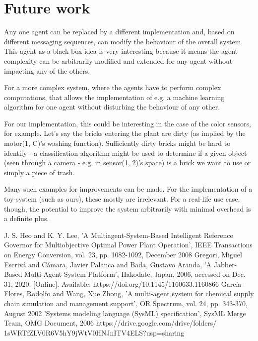 \documentclass[conference]{IEEEtran}
\begin{document}
\section{Future work}

Any one agent can be replaced by a different implementation and, based on different messaging sequences, can modify the behaviour of the overall system. This agent-as-a-black-box idea is very interesting because it means the agent complexity can be arbitrarily modified and extended for any agent without impacting any of the others. 

For a more complex system, where the agents have to perform complex computations, that allows the implementation of e.g. a machine learning algorithm for one agent without disturbing the behaviour of any other. 

For our implementation, this could be interesting in the case of the color sensors, for example. Let's say the bricks entering the plant are dirty (as implied by the motor(1, C)'s washing function). Sufficiently dirty bricks might be hard to identify - a classification algorithm might be used to determine if a given object (seen through a camera - e.g. in sensor(1, 2)'s space) is a brick we want to use or simply a piece of trash.

Many such examples for improvements can be made. For the implementation of a toy-system (such as ours), these mostly are irrelevant. For a real-life use case, though, the potential to improve the system arbitrarily with minimal overhead is a definite plus. 


\begin{thebibliography}{03}
 J. S. Heo and K. Y. Lee, 'A Multiagent-System-Based Intelligent Reference Governor for Multiobjective Optimal Power Plant Operation', IEEE Transactions on Energy Conversion, vol. 23, pp. 1082-1092, December 2008
 Gregori, Miguel Escriv\'{a} and C\'{a}mara, Javier Palanca and Bada, Gustavo Aranda, 'A Jabber-Based Multi-Agent System Platform', Hakodate, Japan, 2006, accessed on Dec. 31, 2020. [Online]. Available: https://doi.org/10.1145/1160633.1160866
 Garc{\'i}a-Flores, Rodolfo and Wang, Xue Zhong, 'A multi-agent system for chemical supply chain simulation and management support', OR Spectrum, vol. 24, pp. 343-370, August 2002
 'Systems modeling language (SysML) specification', SysML Merge Team, OMG Document,  2006
 https://drive.google.com/drive/folders/\\ 1sWRTfZLV0R6V5hY9jWtV0HNJnITV4ELS?usp=sharing

\end{thebibliography}
\end{document}
